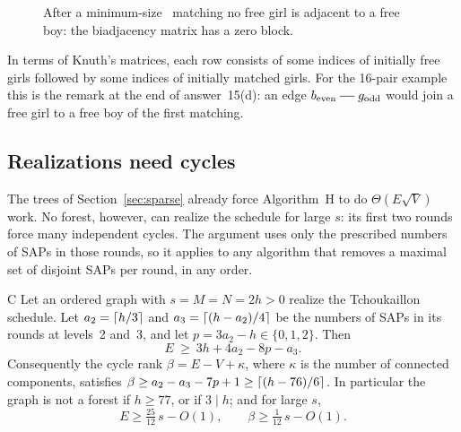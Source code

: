 \begin{figure}[ht]
\centering

\caption{After a minimum-size~ matching no free girl is adjacent to a
free boy: the biadjacency matrix has a zero block.}
\label{fig:blocks}
\end{figure}

In terms of Knuth's matrices, each row consists of some indices of
initially free girls followed by some indices of initially matched girls.
For the 16-pair example this is the remark at the end of answer~15(d):
an edge $b_{\rm even}\sg g_{\rm odd}$ would join a free girl to a free boy
of the first matching.

\subsection{Realizations need cycles}

The trees of Section~\ref{sec:sparse} already force Algorithm~H to do
$\Theta(E\sqrt V)$ work. No forest, however, can realize the schedule for
large $s$: its first two rounds force many independent cycles. The
argument uses only the prescribed numbers of SAPs in those rounds, so it
applies to any algorithm that removes a maximal set of disjoint SAPs per
round, in any order.

\begin{lthm}{C}
Let an ordered graph with $s=M=N=2h>0$ realize the Tchoukaillon schedule.
Let $a_2=\lceil h/3\rceil$ and $a_3=\lceil(h-a_2)/4\rceil$ be the numbers of SAPs in
its rounds at levels~2 and~3, and let $p=3a_2-h\in\{0,1,2\}$. Then
\[
   E\ \ge\ 3h+4a_2-8p-a_3 .
\]
Consequently the cycle rank $\beta=E-V+\kappa$, where $\kappa$ is the number
of connected components, satisfies $\beta\ge a_2-a_3-7p+1\ge\lceil(h-76)/6\rceil$.
In particular the graph is not a forest if $h\ge77$, or if $3\mid h$; and for
large $s$,
\[
   E\ge\tfrac{25}{12}\,s-O(1),\qquad \beta\ge\tfrac1{12}\,s-O(1).
\]
\end{lthm}

